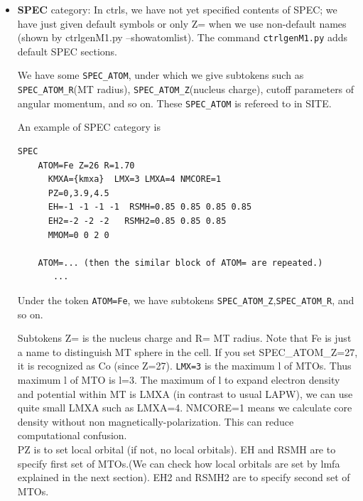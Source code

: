 \documentclass[a4paper,10pt,epsf,fleqn]{article}
\begin{document}
{\begin{itemize}
The SITE\_ATOM=foobar (with same foobar with different POS) are not
necessarily equivalent with respect to the space group operation of a system.
Thus \verb+SITE_ATOM=foobar+ are divided into ``classes'' which are
connected by the operation. 
The lmf automatically judge ``classes'' (see also info by lmchk). 
Thus not need to specify it, but it may be better to check it.
A sample is \verb+lmchk lagao+ at \verb+~/ecalj/lm7K/TESTsamples/LaGaO_relax+

\item
{\bf SPEC} category: 
In ctrls, we have not yet specified contents of SPEC; 
we have just given default symbols or only Z= when we use non-default
names (shown by ctrlgenM1.py --showatomlist).
The command \verb+ctrlgenM1.py+ adds default SPEC sections.

We have some \verb+SPEC_ATOM+, 
under which we give subtokens such as
\verb+SPEC_ATOM_R+(MT radius), \verb+SPEC_ATOM_Z+(nucleus charge), 
cutoff parameters of angular momentum, and so on. 
These \verb+SPEC_ATOM+ is refereed to in SITE.

An example of SPEC category is
\begin{verbatim}
SPEC                                                            
    ATOM=Fe Z=26 R=1.70 
      KMXA={kmxa}  LMX=3 LMXA=4 NMCORE=1                        
      PZ=0,3.9,4.5
      EH=-1 -1 -1 -1  RSMH=0.85 0.85 0.85 0.85          
      EH2=-2 -2 -2   RSMH2=0.85 0.85 0.85
      MMOM=0 0 2 0                                                    
  
    ATOM=... (then the similar block of ATOM= are repeated.)
       ...
\end{verbatim}
Under the token \verb+ATOM=Fe+, we have subtokens
\verb+SPEC_ATOM_Z+,\verb+SPEC_ATOM_R+, and so on.

Subtokens Z= is the nucleus charge and R= MT radius.
Note that Fe is just a name to distinguish MT sphere in the cell.
If you set SPEC\_ATOM\_Z=27, it is recognized as Co (since Z=27). 
\verb+LMX=3+ is the maximum l of MTOs. Thus maximum l of MTO is l=3.
The maximum of l to expand electron density and potential within MT is
LMXA (in contrast to usual LAPW), we can use quite small LMXA such as
LMXA=4. NMCORE=1 means we calculate core density without non magnetically-polarization.
This can reduce computational confusion.\\

PZ is to set local orbital (if not, no local orbitals). EH and RSMH are
to specify first set of MTOs.(We can check how local orbitals are 
set by lmfa explained in the next section).
EH2 and RSMH2 are to specify second set of MTOs. \\


\end{itemize}}
\end{document}
